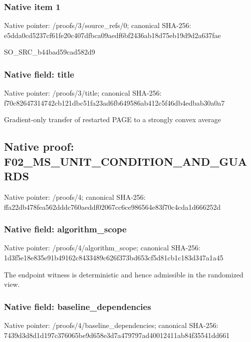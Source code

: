 \documentclass[10pt,a4paper]{article}
\begin{document}
\subsubsection{Native item 1}
Native pointer: /proofs/3/source\_\allowbreak{}refs/0; canonical SHA-256: e5dda0cd5237cf61fe20c407dfbca09aedf6bf2436ab18d75eb19d9d2a637fae

\begingroup\raggedright\sloppy SO\_\allowbreak{}SRC\_\allowbreak{}b44bad59cad582d9\par\endgroup

\subsubsection{Native field: title}
Native pointer: /proofs/3/title; canonical SHA-256: f70c82647314742cb121dbc51fa23ad6fb649586ab412c5f46db4edbab30a0a7

\begingroup\raggedright\sloppy Gradient-only transfer of restarted PAGE to a strongly convex average\par\endgroup

\subsection{Native proof: F02\_\allowbreak{}MS\_\allowbreak{}UNIT\_\allowbreak{}CONDITION\_\allowbreak{}AND\_\allowbreak{}GUARDS}
Native pointer: /proofs/4; canonical SHA-256: ffa22db478fea562dddc760aeddf02067cc6ce986564e83f70c4cda1d666252d

\subsubsection{Native field: algorithm\_\allowbreak{}scope}
Native pointer: /proofs/4/algorithm\_\allowbreak{}scope; canonical SHA-256: 1d3f5e18e835e91b49162c8433489c626f373bd653cf5d81cb1c183d347a1a45

\begingroup\raggedright\sloppy The endpoint witness is deterministic and hence admissible in the randomized view.\par\endgroup

\subsubsection{Native field: baseline\_\allowbreak{}dependencies}
Native pointer: /proofs/4/baseline\_\allowbreak{}dependencies; canonical SHA-256: 7439d3d8d1d197c376065be9d658e3d7a479797ad40012411ab84f35541dd661
\end{document}
